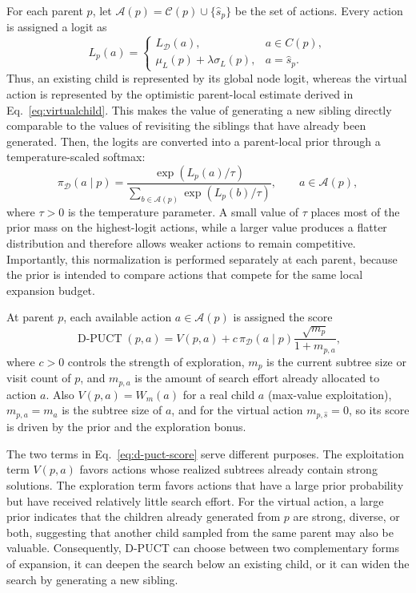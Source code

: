 \documentclass{article} %
\newcommand{\Ch}[1]{\mathcal{C}(#1)}
\newcommand{\vchild}{\hat{s}}
\begin{document}
For each parent $p$, let
$\mathcal{A}(p)
=
\Ch p\cup\{\hat{s}_p\}$ be the set of actions.
Every action is assigned a logit as
\begin{equation*}
L_p(a)
=
\begin{cases}
L_{\mathcal D}(a),
    & a\in C(p), \\[4pt]
\mu_L(p)+\lambda\sigma_L(p),
    & a=\hat{s}_p.
\end{cases}
\end{equation*}
Thus, an existing child is represented by its global node logit, whereas the
virtual action is represented by the optimistic parent-local estimate derived
in Eq.~\eqref{eq:virtualchild}. This makes the value of generating a new sibling
directly comparable to the values of revisiting the siblings that have already
been generated.
Then, the logits are converted into a parent-local prior through a temperature-scaled
softmax:
\begin{equation}
\pi_{\mathcal D}(a\mid p)
=
\frac{
\exp\!\left(L_p(a)/\tau\right)
}{
\displaystyle
\sum_{b\in\mathcal A(p)}
\exp\!\left(L_p(b)/\tau\right)
},
\qquad
a\in\mathcal A(p),
\label{eq:parent-local-prior}
\end{equation}
where $\tau>0$ is the temperature parameter. A small value of $\tau$ places
most of the prior mass on the highest-logit actions, while a larger value
produces a flatter distribution and therefore allows weaker actions to remain
competitive. Importantly, this normalization is performed separately at each
parent, because the prior is intended to compare actions that compete for the
same local expansion budget.

At parent $p$, each available action $a\in\mathcal A(p)$ is assigned the score
\begin{equation}
\operatorname{D\text{-}PUCT}(p,a)
=
V(p,a)
+
c\,
\pi_{\mathcal D}(a\mid p)
\frac{\sqrt{m_p}}{1+m_{p,a}},
\label{eq:d-puct-score}
\end{equation}
where $c>0$ controls the strength of exploration, $m_p$ is the current subtree
size or visit count of $p$, and $m_{p,a}$ is the amount of search effort already
allocated to action $a$. Also $V(p,a) = W_m(a)$ for a real child $a$ (max-value exploitation), $m_{p,a} = m_a$ is the subtree size of $a$, and for the virtual action $m_{p,\vchild} = 0$, so its score is driven by the prior and the exploration bonus.

The two terms in Eq.~\eqref{eq:d-puct-score} serve different purposes.
The exploitation term $V(p,a)$ favors actions whose realized subtrees already
contain strong solutions. The exploration term favors actions that have a
large prior probability but have received relatively little search effort.
For the virtual action, a large prior indicates that the children already
generated from $p$ are strong, diverse, or both, suggesting that another child
sampled from the same parent may also be valuable.
Consequently, D-PUCT can choose between two complementary forms of expansion,
it can deepen the search below an existing child, or it can widen the search by
generating a new sibling.
\end{document}
